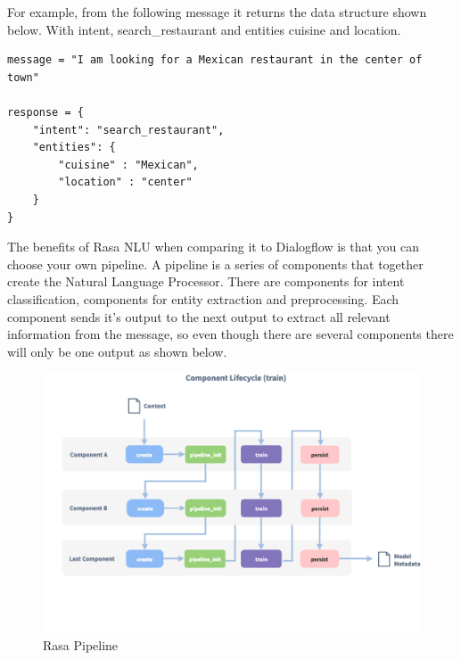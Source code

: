 For example, from the following message it returns the data structure shown below. With intent, search\_restaurant and entities cuisine and location.

\begin{lstlisting}[caption={NLU example},captionpos=b]
message = "I am looking for a Mexican restaurant in the center of town"

response = {
	"intent": "search_restaurant",
	"entities": {
		"cuisine" : "Mexican",
		"location" : "center"
	}
}

\end{lstlisting}

The benefits of Rasa NLU when comparing it to Dialogflow is that you can choose your own pipeline. A pipeline is a series of components that together create the Natural Language Processor. There are components for intent classification, components for entity extraction and preprocessing. Each component sends it’s output to the next output to extract all relevant information from the message, so even though there are several components there will only be one output as shown below.

\begin{center}
	\begin{figure}[h!]
		\centering
		\includegraphics[scale=0.35]{./images/3-rasa-pipe}
		\caption{Rasa Pipeline}
		\label{rasa_pipe}
	\end{figure}
\end{center}

